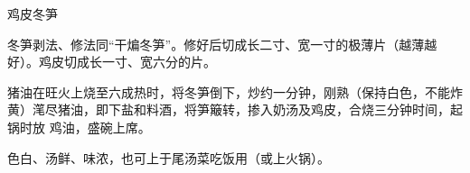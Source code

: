%
%
%
%
%
%
%
\begin{recipe}{鸡皮冬笋}

\ingredients


\preparation

\step 冬笋剥法、修法同“干煸冬笋”。修好后切成长二寸、宽一寸的极薄片（越薄越
好）。鸡皮切成长一寸、宽六分的片。

\step 猪油在旺火上烧至六成热时，将冬笋倒下，炒约一分钟，刚熟（保持白色，不能炸
黄）滗尽猪油，即下盐和料酒，将笋簸转，掺入奶汤及鸡皮，合烧三分钟时间，起锅时放
鸡油，盛碗上席。

\features

色白、汤鲜、味浓，也可上于尾汤菜吃饭用（或上火锅）。

\end{recipe}

